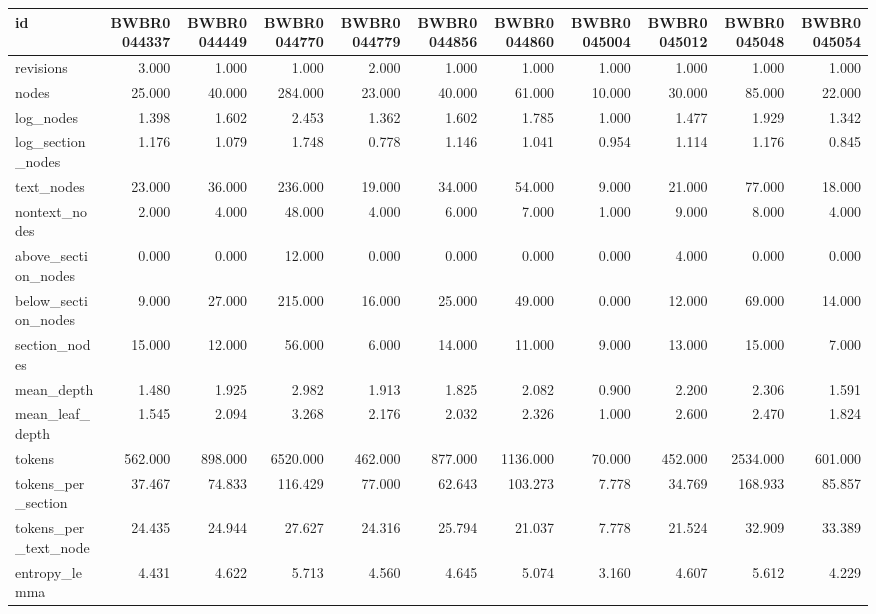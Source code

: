 \begin{tabular}{lrrrrrrrrrr}
\toprule
id & BWBR0044337 & BWBR0044449 & BWBR0044770 & BWBR0044779 & BWBR0044856 & BWBR0044860 & BWBR0045004 & BWBR0045012 & BWBR0045048 & BWBR0045054 \\
\midrule
revisions & 3.000 & 1.000 & 1.000 & 2.000 & 1.000 & 1.000 & 1.000 & 1.000 & 1.000 & 1.000 \\
\cline{1-11}
nodes & 25.000 & 40.000 & 284.000 & 23.000 & 40.000 & 61.000 & 10.000 & 30.000 & 85.000 & 22.000 \\
\cline{1-11}
log\_nodes & 1.398 & 1.602 & 2.453 & 1.362 & 1.602 & 1.785 & 1.000 & 1.477 & 1.929 & 1.342 \\
\cline{1-11}
log\_section\_nodes & 1.176 & 1.079 & 1.748 & 0.778 & 1.146 & 1.041 & 0.954 & 1.114 & 1.176 & 0.845 \\
\cline{1-11}
text\_nodes & 23.000 & 36.000 & 236.000 & 19.000 & 34.000 & 54.000 & 9.000 & 21.000 & 77.000 & 18.000 \\
\cline{1-11}
nontext\_nodes & 2.000 & 4.000 & 48.000 & 4.000 & 6.000 & 7.000 & 1.000 & 9.000 & 8.000 & 4.000 \\
\cline{1-11}
above\_section\_nodes & 0.000 & 0.000 & 12.000 & 0.000 & 0.000 & 0.000 & 0.000 & 4.000 & 0.000 & 0.000 \\
\cline{1-11}
below\_section\_nodes & 9.000 & 27.000 & 215.000 & 16.000 & 25.000 & 49.000 & 0.000 & 12.000 & 69.000 & 14.000 \\
\cline{1-11}
section\_nodes & 15.000 & 12.000 & 56.000 & 6.000 & 14.000 & 11.000 & 9.000 & 13.000 & 15.000 & 7.000 \\
\cline{1-11}
mean\_depth & 1.480 & 1.925 & 2.982 & 1.913 & 1.825 & 2.082 & 0.900 & 2.200 & 2.306 & 1.591 \\
\cline{1-11}
mean\_leaf\_depth & 1.545 & 2.094 & 3.268 & 2.176 & 2.032 & 2.326 & 1.000 & 2.600 & 2.470 & 1.824 \\
\cline{1-11}
tokens & 562.000 & 898.000 & 6520.000 & 462.000 & 877.000 & 1136.000 & 70.000 & 452.000 & 2534.000 & 601.000 \\
\cline{1-11}
tokens\_per\_section & 37.467 & 74.833 & 116.429 & 77.000 & 62.643 & 103.273 & 7.778 & 34.769 & 168.933 & 85.857 \\
\cline{1-11}
tokens\_per\_text\_node & 24.435 & 24.944 & 27.627 & 24.316 & 25.794 & 21.037 & 7.778 & 21.524 & 32.909 & 33.389 \\
\cline{1-11}
entropy\_lemma & 4.431 & 4.622 & 5.713 & 4.560 & 4.645 & 5.074 & 3.160 & 4.607 & 5.612 & 4.229 \\

\end{tabular}
